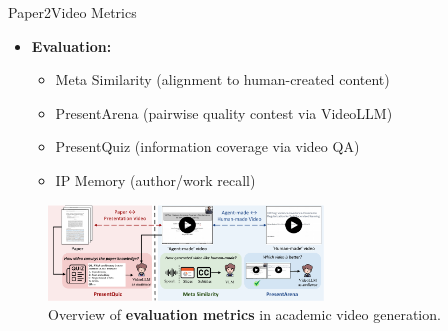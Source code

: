\documentclass{beamer}
\newcommand{\alertterm}[1]{\alert{\textbf{#1}}}
\newcommand{\bench}{Paper2Video}
\begin{document}
\begin{frame}{{\bench} Metrics}
  \begin{itemize}
    \item \alertterm{Evaluation:}
      \begin{itemize}
          \item Meta Similarity (alignment to human-created content)
          \item PresentArena (pairwise quality contest via VideoLLM)
          \item PresentQuiz (information coverage via video QA)
          \item IP Memory (author/work recall)
      \end{itemize}
  \end{itemize}
  \vspace{0.2cm}
  \begin{figure}
    \includegraphics[width=0.65\textwidth]{figure/eval.pdf}
    \caption{Overview of \alertterm{evaluation metrics} in academic video generation.}
    \label{fig:eval}
  \end{figure}
\end{frame}
\end{document}
